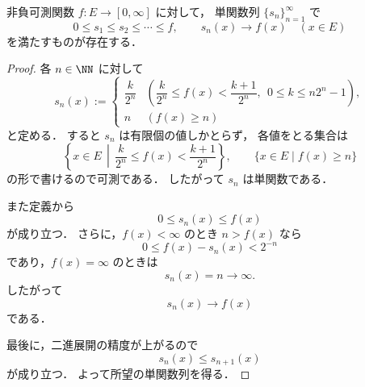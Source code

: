 \begin{lemma}[単関数による近似]
非負可測関数 $f:E \to [0,\infty]$ に対して，
単関数列 $\{s_n\}_{n=1}^{\infty}$ で
\[
0 \le s_1 \le s_2 \le \cdots \le f,
\qquad
s_n(x) \to f(x)\quad (x \in E)
\]
を満たすものが存在する．
\end{lemma}
\begin{proof}
各 $n \in \NN$ に対して
\[
s_n(x)
:=
\begin{cases}
\dfrac{k}{2^n}
&\left(
\dfrac{k}{2^n} \le f(x) < \dfrac{k+1}{2^n},
\ \ 0 \le k \le n2^n-1
\right),\\[1.2ex]
n & (f(x)\ge n)
\end{cases}
\]
と定める．
すると $s_n$ は有限個の値しかとらず，
各値をとる集合は
\[
\left\{x \in E \,\middle|\, \frac{k}{2^n} \le f(x) < \frac{k+1}{2^n}\right\},
\qquad
\{x \in E \mid f(x)\ge n\}
\]
の形で書けるので可測である．
したがって $s_n$ は単関数である．

また定義から
\[
0 \le s_n(x) \le f(x)
\]
が成り立つ．
さらに，$f(x)<\infty$ のとき $n>f(x)$ なら
\[
0 \le f(x)-s_n(x)<2^{-n}
\]
であり，$f(x)=\infty$ のときは
\[
s_n(x)=n \to \infty.
\]
したがって
\[
s_n(x)\to f(x)
\]
である．

最後に，二進展開の精度が上がるので
\[
s_n(x)\le s_{n+1}(x)
\]
が成り立つ．
よって所望の単関数列を得る．
\end{proof}

